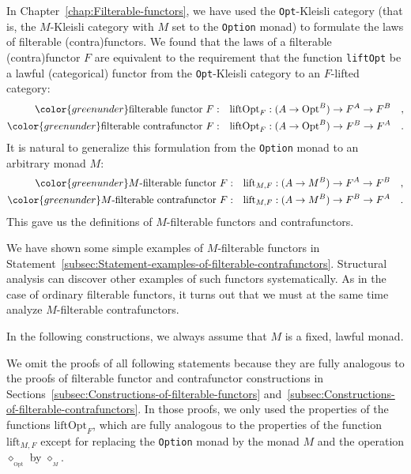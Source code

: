 In Chapter~\ref{chap:Filterable-functors}, we have used the \lstinline!Opt!-Kleisli
category (that is, the $M$-Kleisli category with $M$ set to the
\lstinline!Option! monad) to formulate the laws of filterable (contra)functors.
We found that the laws of a filterable (contra)functor $F$ are equivalent
to the requirement that the function \lstinline!liftOpt! be a lawful
(categorical) functor from the \lstinline!Opt!-Kleisli category to
an $F$-lifted category:
\begin{align*}
{\color{greenunder}\text{filterable functor }F:}\quad & \text{liftOpt}_{F}:(A\rightarrow\text{Opt}^{B})\rightarrow F^{A}\rightarrow F^{B}\quad,\\
{\color{greenunder}\text{filterable contrafunctor }F:}\quad & \text{liftOpt}_{F}:(A\rightarrow\text{Opt}^{B})\rightarrow F^{B}\rightarrow F^{A}\quad.
\end{align*}
It is natural to generalize this formulation from the \lstinline!Option!
monad to an arbitrary monad $M$:
\begin{align*}
{\color{greenunder}M\text{-filterable functor }F:}\quad & \text{lift}_{M,F}:(A\rightarrow M^{B})\rightarrow F^{A}\rightarrow F^{B}\quad,\\
{\color{greenunder}M\text{-filterable contrafunctor }F:}\quad & \text{lift}_{M,F}:(A\rightarrow M^{B})\rightarrow F^{B}\rightarrow F^{A}\quad.
\end{align*}
 This gave us the definitions of $M$-filterable functors and contrafunctors.

We have shown some simple examples of $M$-filterable functors in
Statement~\ref{subsec:Statement-examples-of-filterable-contrafunctors}.
Structural analysis can discover other examples of such functors systematically.
As in the case of ordinary filterable functors, it turns out that
we must at the same time analyze $M$-filterable contrafunctors.

In the following constructions, we always assume that $M$ is a fixed,
lawful monad.

We omit the proofs of all following statements because they are fully
analogous to the proofs of filterable functor and contrafunctor constructions
in Sections~\ref{subsec:Constructions-of-filterable-functors} and~\ref{subsec:Constructions-of-filterable-contrafunctors}.
In those proofs, we only used the properties of the functions $\text{liftOpt}_{F}$,
which are fully analogous to the properties of the function $\text{lift}_{M,F}$
except for replacing the \lstinline!Option! monad by the monad $M$
and the operation $\diamond_{_{\text{Opt}}}$ by $\diamond_{_{M}}$.

